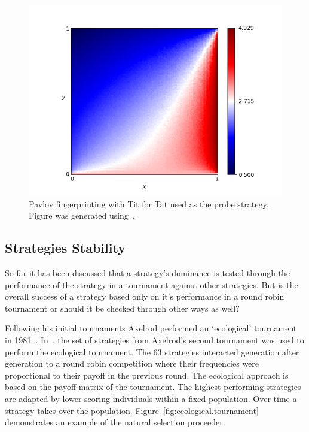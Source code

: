 \documentclass{article}
\begin{document}
\begin{figure}[!hbtp]
    \centering
    \includegraphics[height=.3\textheight]{./assets/images/Win-Stay_Lose-Shift.png}
    \caption{Pavlov fingerprinting with Tit for Tat used as the probe strategy.
    Figure was generated using~\cite{axelrodproject}.}
    \label{fig:fingerprinting}
\end{figure}

\subsection{Strategies Stability}

So far it has been discussed that a strategy's dominance is tested through
the performance of the strategy in a tournament against other strategies.
But is the overall success of a strategy based only on it's performance in a 
round robin tournament or should it be checked through other ways as well?

Following his initial tournaments Axelrod performed an `ecological' tournament
in 1981~\cite{Axelrod1981}. In~\cite{Axelrod1981}, the set of strategies from 
Axelrod's second tournament was used to perform the ecological tournament. The 
63 strategies interacted generation after generation to a round robin competition
where their frequencies were proportional to their payoff in the previous round.
The ecological approach is based on the payoff matrix of the tournament. The
highest performing strategies are adapted by lower scoring individuals
within a fixed population. Over time a strategy takes over the population.
Figure~\ref{fig:ecological.tournament} demonstrates an example of the
natural selection proceeder.
\end{document}
